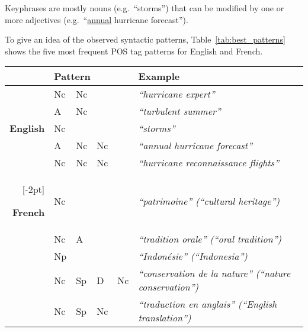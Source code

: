     \begin{property}\label{prop:noun_phrases}
      Keyphrases are mostly nouns (e.g.~``storms'') that can be modified by one
      or more adjectives (e.g.~``\underline{annual} hurricane forecast'').
    \end{property}

    To give an idea of the observed syntactic patterns,
    Table~\ref{tab:best_patterns} shows the five most frequent POS tag patterns
    for English and French.
    \begin{table*}
      \centering
      \begin{tabular}{@{~}rl@{~~}l@{~~}l@{~~}ll@{~}}
        \toprule
        & \multicolumn{4}{l}{\hspace{-.5em}\textbf{Pattern}} & \textbf{Example}\\
        \midrule
        \multirow{5}{*}[-2pt]{\begin{sideways}\textbf{English}\end{sideways}} & Nc & Nc & & & \textit{``hurricane expert''}\\ %
        & A & Nc & & & \textit{``turbulent summer''}\\ %
        & Nc & & & & \textit{``storms''}\\ %
        & A & Nc & Nc & & \textit{``annual hurricane forecast''}\\ %
        & Nc & Nc & Nc & & \textit{``hurricane reconnaissance flights''}\\ %
        \addlinespace[1.5\defaultaddspace]
        \multirow{5}{*}[-2pt]{\begin{sideways}\textbf{French}\end{sideways}} & Nc & & & & \textit{``patrimoine'' (``cultural heritage'')}\\ %
        & Nc & A & & & \textit{``tradition orale'' (``oral tradition'')}\\ %
        & Np & & & & \textit{``Indonésie'' (``Indonesia'')}\\ %
        & Nc & Sp & D & Nc & \textit{``conservation de la nature'' (``nature conservation'')}\\ %
        & Nc & Sp & Nc & & \textit{``traduction en anglais'' (``English translation'')}\\ %
        \bottomrule
      \end{tabular}
      \caption{Frequent part-of-speech patterns (Multex format) for English and
               French keyphrases. \label{tab:best_patterns}}
    \end{table*}

